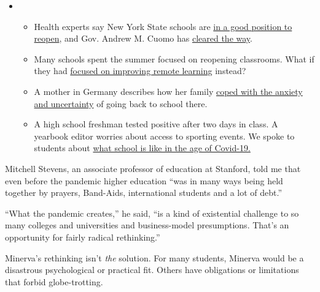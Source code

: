 \begin{itemize}
\item
  \begin{itemize}
  \tightlist
  \item
    Health experts say New York State schools are
    \href{https://www.nytimes.com/2020/08/07/health/coronavirus-ny-schools-reopen.html?action=click\&pgtype=Article\&state=default\&region=MAIN_CONTENT_2\&context=storylines_keepup}{in
    a good position to reopen}, and Gov. Andrew M. Cuomo has
    \href{https://www.nytimes.com/2020/08/07/nyregion/cuomo-schools-reopening.html?action=click\&pgtype=Article\&state=default\&region=MAIN_CONTENT_2\&context=storylines_keepup}{cleared
    the way}.
  \item
    Many schools spent the summer focused on reopening classrooms. What
    if they had
    \href{https://www.nytimes.com/2020/08/07/us/remote-learning-fall-2020.html?action=click\&pgtype=Article\&state=default\&region=MAIN_CONTENT_2\&context=storylines_keepup}{focused
    on improving remote learning} instead?
  \item
    A mother in Germany describes how her family
    \href{https://www.nytimes.com/2020/08/07/parenting/germany-schools-reopening-children.html?action=click\&pgtype=Article\&state=default\&region=MAIN_CONTENT_2\&context=storylines_keepup}{coped
    with the anxiety and uncertainty} of going back to school there.
  \item
    A high school freshman tested positive after two days in class. A
    yearbook editor worries about access to sporting events. We spoke to
    students about
    \href{https://www.nytimes.com/2020/08/06/us/coronavirus-students.html?action=click\&pgtype=Article\&state=default\&region=MAIN_CONTENT_2\&context=storylines_keepup}{what
    school is like in the age of Covid-19.}
  \end{itemize}
\end{itemize}

Mitchell Stevens, an associate professor of education at Stanford, told
me that even before the pandemic higher education ``was in many ways
being held together by prayers, Band-Aids, international students and a
lot of debt.''

``What the pandemic creates,'' he said, ``is a kind of existential
challenge to so many colleges and universities and business-model
presumptions. That's an opportunity for fairly radical rethinking.''

Minerva's rethinking isn't \emph{the} solution. For many students,
Minerva would be a disastrous psychological or practical fit. Others
have obligations or limitations that forbid globe-trotting.

